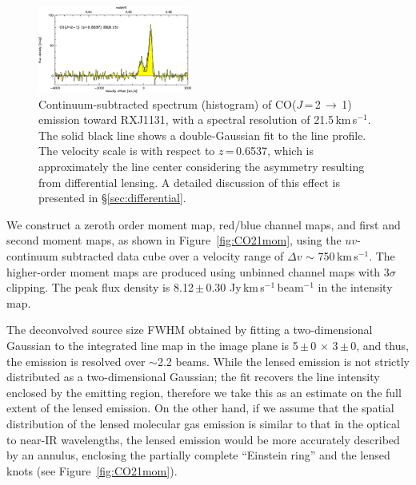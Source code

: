 \documentclass[]{emulateapj}
\newcommand{\rarr}{$\rightarrow$}
\newcommand{\bco}{\mbox{CO($J$\,=\,2\,\rarr\,1)}\xspace}
\newcommand{\kms}{\mbox{km\,s$^{-1}$}\xspace}
\newcommand{\pmOne}{\mbox{$^{-1}$}\xspace}
\newcommand{\pmm}{\,$\pm$\,}
\newcommand{\Fig}[1]{Figure~\ref{fig:#1}}
\newcommand{\Sec}[1]{\S\ref{sec:#1}}
\newcommand{\nir}{near-IR\xspace}
\begin{document}
\begin{figure}[htbp]
\centering
\includegraphics[width=0.45\textwidth]{f1.eps}
\caption{Continuum-subtracted spectrum (histogram) of \bco emission toward RXJ1131, with a spectral resolution of
21.5\,\kms. The solid black line shows a double-Gaussian fit to the line profile.
The velocity scale is with respect to $z$\,=\,0.6537, which is approximately the line center
considering the asymmetry resulting from differential lensing.
A detailed discussion of this effect is presented in \Sec{differential}. \label{fig:CO21spec}}
\end{figure}
\vspace{.2em}
We construct a zeroth order moment map, red/blue channel maps, and
first and second moment maps, as shown in \Fig{CO21mom},
using the $uv$-continuum subtracted data cube over a velocity range of
$\Delta v$ $\sim$ 750\,\kms.
The higher-order moment maps are produced using
unbinned channel maps with 3$\sigma$ clipping.
The peak flux density is 8.12\pmm0.30 Jy\,\kms\,beam\pmOne
in the intensity map.

The deconvolved source size FWHM obtained by fitting a two-dimensional Gaussian to the integrated line map in
the image plane
is 5\pmm0 $\times$ 3\pmm0,
and thus, the emission is resolved over $\sim$2.2 beams.
While the lensed emission is not strictly distributed as a two-dimensional
Gaussian;
the fit recovers the line intensity enclosed by the emitting
region, therefore we take this as an estimate on the full extent of the lensed
emission. On the other hand, if we assume that the spatial distribution of
the lensed molecular gas emission is similar to that in the optical to \nir
wavelengths, the lensed emission would be more accurately described by an
annulus, enclosing the partially complete ``Einstein ring'' and
the lensed knots (see \Fig{CO21mom}).
\end{document}
